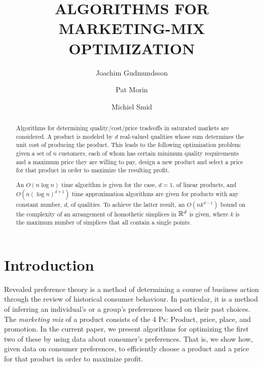\documentclass[lotsofwhite]{patmorin}
\title{\MakeUppercase{Algorithms for Marketing-Mix Optimization}}
\author{Joachim Gudmundsson%
	\and Pat Morin%
	\and Michiel Smid}
\begin{document}
\maketitle
\begin{abstract}
  Algorithms for determining quality/cost/price tradeoffs in saturated
  markets are considered.  A product is modeled by $d$ real-valued
  qualities whose sum determines the unit cost of producing the product.
  This leads to the following optimization problem: given a set of $n$
  customers, each of whom has certain minimum quality requirements and a
  maximum price they are willing to pay, design a new product and select
  a price for that product in order to maximize the resulting profit.

  An $O(n\log n)$ time algorithm is given for the case, $d=1$, of linear
  products, and $O(n(\log n)^{d+1})$ time approximation algorithms
  are given for products with any constant number, $d$, of qualities.
  To achieve the latter result, an $O(nk^{d-1})$ bound on the complexity
  of an arrangement of homothetic simplices in $\mathbb{R}^d$ is given, where $k$
  is the maximum number of simplices that all contain a single points.
\end{abstract}

\section{Introduction}

Revealed preference theory \cite{v06} is a method of determining a course
of business action through the review of historical consumer behaviour.  In
particular, it is a method of inferring an individual's or a group's
preferences based on their past choices.  The \emph{marketing mix}
\cite{kpkl05} of a product consists of the 4 Ps: Product, price, place, and
promotion.  In the current paper, we present algorithms for optimizing the
first two of these by using data about consumer's preferences.  That is, we
show how, given data on consumer preferences, to efficiently choose a
product and a price for that product in order to maximize profit.
\end{document}
